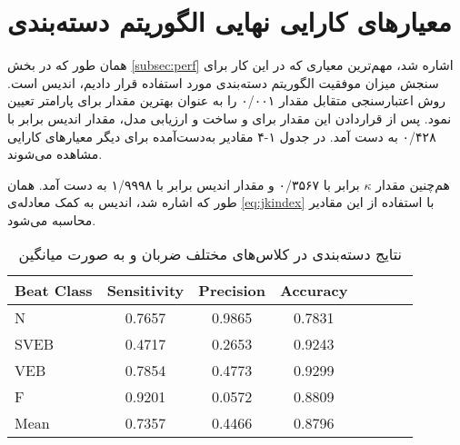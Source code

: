\section{معیارهای کارایی نهایی الگوریتم دسته‌بندی}
همان طور که در بخش \ref{subsec:perf} اشاره شد، مهم‌ترین معیاری که در این کار برای سنجش میزان موفقیت الگوریتم دسته‌بندی مورد استفاده قرار دادیم، اندیس  است. روش اعتبارسنجی متقابل مقدار  ۰/۰۰۱ را به عنوان بهترین مقدار برای پارامتر  تعیین نمود. پس از قراردادن این مقدار برای  و ساخت و ارزیابی مدل، مقدار اندیس  برابر با ۰/۴۲۸ به دست آمد. در جدول ۱-۴ مقادیر به‌دست‌آمده برای دیگر معیارهای کارایی مشاهده می‌شوند.

هم‌چنین مقدار $\kappa$ برابر با ۰/۳۵۶۷ و مقدار اندیس  برابر با ۱/۹۹۹۸ به دست آمد. همان طور که اشاره شد، اندیس   به کمک معادله‌ی \ref{eq:jkindex} با استفاده از این مقادیر محاسبه می‌شود.


\begin{table}
\begin{center}
\begin{latin} 
\begin{tabular}{l*{6}{c}r}
Beat Class              & Sensitivity & Precision & Accuracy  \\
\hline
N & 0.7657 & 0.9865 & 0.7831  \\
SVEB            & 0.4717 & 0.2653 & 0.9243  \\
VEB           & 0.7854 & 0.4773 & 0.9299  \\
F    & 0.9201 & 0.0572 & 0.8809  \\
Mean    & 0.7357 & 0.4466 & 0.8796  \\
\end{tabular}
\end{latin}
\caption{نتایج دسته‌بندی در کلاس‌های مختلف ضربان و به صورت میانگین}
\end{center}
\label{table:results}
\end{table}






